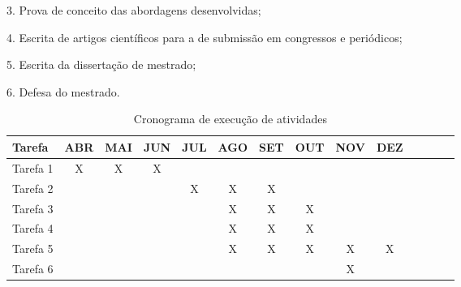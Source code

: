   3. Prova de conceito das abordagens desenvolvidas;
    
  4. Escrita de artigos científicos para a de submissão em congressos e periódicos;
  
  5. Escrita da dissertação de mestrado;
  
  6. Defesa do mestrado.

\begin{table}[!htpb]
	\centering
	\caption{Cronograma de execução de atividades}
	\begin{center}
		\begin{tabular}{|l|c|c|c|c|c|c|c|c|c|c|c|c|c|} \hline
Tarefa&ABR&MAI&JUN&JUL&AGO&SET&OUT&NOV&DEZ\\
			\hline
			Tarefa 1 &X&X&X& & & & & & \\
			\hline
			Tarefa 2 & & & &X&X&X& & & \\
			\hline
			Tarefa 3 & & & & &X&X&X& & \\
			\hline
			Tarefa 4 & & & & &X&X&X& & \\
			\hline
			Tarefa 5 & & & &&X&X&X&X&X \\
			\hline
			Tarefa 6 & & & & & & & & X& \\
			\hline
		\end{tabular}
		\label{tab:cronograma}
	\end{center}
\end{table} 


\selectfont%